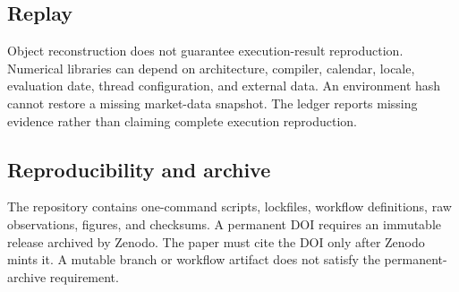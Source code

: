 \subsection{Replay}
Object reconstruction does not guarantee execution-result reproduction. Numerical libraries can depend on architecture, compiler, calendar, locale, evaluation date, thread configuration, and external data. An environment hash cannot restore a missing market-data snapshot. The ledger reports missing evidence rather than claiming complete execution reproduction.

\subsection{Reproducibility and archive}
The repository contains one-command scripts, lockfiles, workflow definitions, raw observations, figures, and checksums. A permanent DOI requires an immutable release archived by Zenodo. The paper must cite the DOI only after Zenodo mints it. A mutable branch or workflow artifact does not satisfy the permanent-archive requirement.
